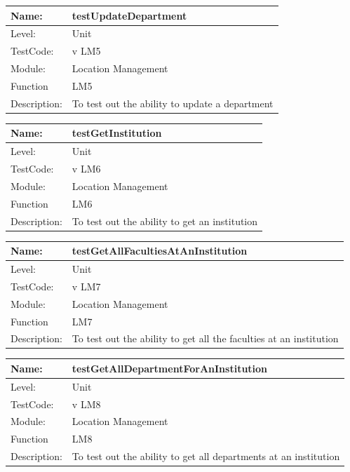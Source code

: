 \documentclass[12pt]{article}
\begin{document}
\begin{center}
\begin{tabular}{|l|p{12cm}|}
\hline

 Name: & testUpdateDepartment \\
 \hline
Level: & Unit \\
\hline
TestCode: & v LM5 \\
\hline
Module:& Location Management \\
\hline
Function & LM5 \\
\hline
Description: & To test out the ability to update a department  \\
\hline
\end{tabular}
\end{center}

\begin{center}
\begin{tabular}{|l|p{12cm}|}
\hline

 Name: & testGetInstitution \\
 \hline
Level: & Unit \\
\hline
TestCode: & v LM6 \\
\hline
Module:& Location Management \\
\hline
Function & LM6 \\
\hline
Description: & To test out the ability to get an institution  \\
\hline
\end{tabular}
\end{center}

\begin{center}
\begin{tabular}{|l|p{12cm}|}
\hline

 Name: & testGetAllFacultiesAtAnInstitution \\
 \hline
Level: & Unit \\
\hline
TestCode: & v LM7 \\
\hline
Module:& Location Management \\
\hline
Function & LM7 \\
\hline
Description: & To test out the ability to get all the faculties at an institution  \\
\hline
\end{tabular}
\end{center}

\begin{center}
\begin{tabular}{|l|p{12cm}|}
\hline

 Name: & testGetAllDepartmentForAnInstitution \\
 \hline
Level: & Unit \\
\hline
TestCode: & v LM8 \\
\hline
Module:& Location Management \\
\hline
Function & LM8 \\
\hline
Description: & To test out the ability to get all departments at an institution  \\
\hline
\end{tabular}
\end{center}
\end{document}
